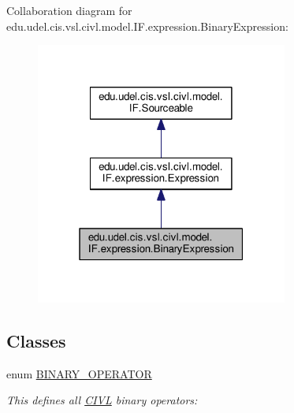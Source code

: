 Collaboration diagram for edu.\+udel.\+cis.\+vsl.\+civl.\+model.\+I\+F.\+expression.\+Binary\+Expression\+:
\nopagebreak
\begin{figure}[H]
\begin{center}
\leavevmode
\includegraphics[width=235pt]{interfaceedu_1_1udel_1_1cis_1_1vsl_1_1civl_1_1model_1_1IF_1_1expression_1_1BinaryExpression__coll__graph}
\end{center}
\end{figure}
\subsection*{Classes}
\begin{DoxyCompactItemize}
\item 
enum \hyperlink{enumedu_1_1udel_1_1cis_1_1vsl_1_1civl_1_1model_1_1IF_1_1expression_1_1BinaryExpression_1_1BINARY__OPERATOR}{B\+I\+N\+A\+R\+Y\+\_\+\+O\+P\+E\+R\+A\+T\+O\+R}
\begin{DoxyCompactList}\small\item\em This defines all \hyperlink{classedu_1_1udel_1_1cis_1_1vsl_1_1civl_1_1CIVL}{C\+I\+V\+L} binary operators\+: ~\newline
 \end{DoxyCompactList}\end{DoxyCompactItemize}
